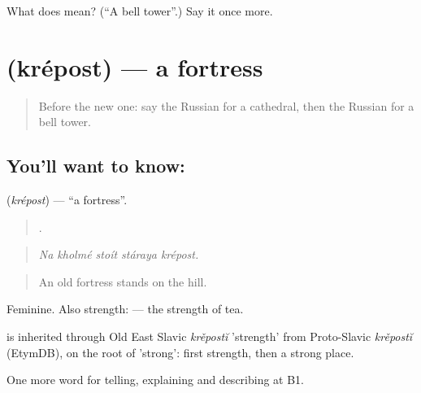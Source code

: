\begin{tcolorbox}[breakable,colback=teal!4,colframe=teal!35!black,title={Before you move on}]
What does  mean? (\textquotedblleft{}A bell tower\textquotedblright{}.) Say it once more.
\end{tcolorbox}
\section[\texorpdfstring{\ru{крепость} (krépost)}{крепость (krépost)}]{ (krépost) — a fortress}

\label{lesson:RU-C444-krepost}



\begin{quote}
Before the new one: say the Russian for a cathedral, then the Russian for a bell tower.
\end{quote}

\subsection*{You'll want to know: }
\textbf{} (\emph{krépost}) — \textquotedblleft{}a fortress\textquotedblright{}.

\begin{quote}
    .
\end{quote}

\begin{quote}
\emph{Na kholmé stoít stáraya krépost.}
\end{quote}

\begin{quote}
An old fortress stands on the hill.
\end{quote}

Feminine. Also strength: \emph{ } — the strength of tea.

\begin{cousinweb}
\emph{} is inherited through Old East Slavic \emph{krěpostĭ} 'strength' from Proto-Slavic \emph{krěpostĭ} (EtymDB), on the root of \emph{} 'strong': first strength, then a strong place.
\end{cousinweb}

\begin{grammarlens}[title={What you've built}]
One more word for telling, explaining and describing at B1.
\end{grammarlens}

